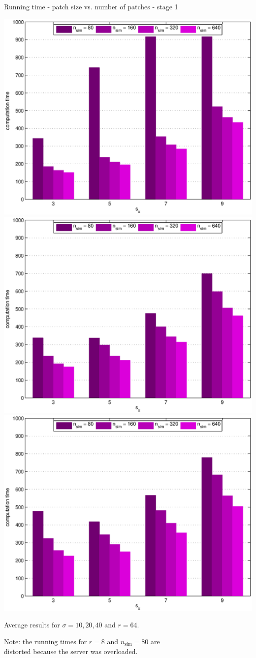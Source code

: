 \documentclass[mathserif, 8pt]{beamer}
\makeatletter
\newcounter{multipleslide}
\newcommand{\restoreframe}{%
\patchcmd{\beamer@@tmpl@footline}%
	{\themultipleslide}%
	{\insertframenumber}%
	{}%
	{}%
\setcounter{framenumber}{\value{multipleslide}}%
}
\makeatother
\begin{document}
\begin{frame}{Running time - patch size vs. number of patches - stage 1}
	\begin{center}
		\includegraphics[width=.33\textwidth]{time_px1-np1-bars_1r64_s10_average.eps}%
		\includegraphics[width=.33\textwidth]{time_px1-np1-bars_1r64_s20_average.eps}%
		\includegraphics[width=.33\textwidth]{time_px1-np1-bars_1r64_s40_average.eps}
	\end{center}
	\begin{center}
	Average results for $\sigma = 10, 20, 40$ and $r = 64$.

	\bigskip

	Note: the running times for $r = 8$ and $n_{\text{sim}} = 80$ are \\
	distorted because the server was overloaded.
	\end{center}
\end{frame}
\restoreframe
\end{document}
